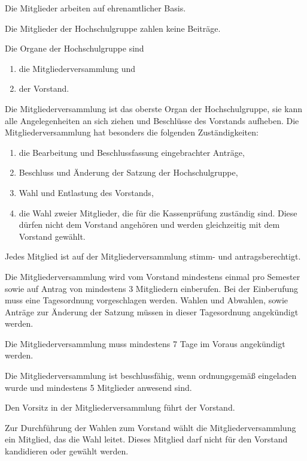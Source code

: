 \documentclass[a4paper, parskip=half, numbers=noenddot]{scrartcl}
\begin{document}
\begin{contract}
Die Mitglieder arbeiten auf ehrenamtlicher Basis.

Die Mitglieder der Hochschulgruppe zahlen keine Beiträge.

%
%


Die Organe der Hochschulgruppe sind

  \begin{enumerate}
  \item die Mitgliederversammlung und
  \item der Vorstand.
  \end{enumerate}


%
%

%

Die Mitgliederversammlung ist das oberste Organ der Hochschulgruppe,
sie kann alle Angelegenheiten an sich ziehen und Beschlüsse des Vorstands
aufheben. Die Mitgliederversammlung hat besonders die folgenden Zuständigkeiten:
\begin{enumerate}
  \item die Bearbeitung und Beschlussfassung eingebrachter Anträge,
  \item Beschluss und Änderung der Satzung der Hochschulgruppe,
  \item Wahl und Entlastung des Vorstands,
  \item die Wahl zweier Mitglieder, die für die Kassenprüfung zuständig sind.
    Diese dürfen nicht dem Vorstand angehören und werden gleichzeitig mit dem Vorstand gewählt.
\end{enumerate}

Jedes Mitglied ist auf der Mitgliederversammlung stimm- und antragsberechtigt.

Die Mitgliederversammlung wird vom Vorstand mindestens einmal pro Semester sowie
auf Antrag von mindestens 3 Mitgliedern einberufen.
Bei der Einberufung muss eine Tagesordnung vorgeschlagen werden.
Wahlen und Abwahlen, sowie Anträge zur Änderung der Satzung müssen in dieser
Tagesordnung angekündigt werden.

Die Mitgliederversammlung muss mindestens 7 Tage im Voraus angekündigt
werden.

Die Mitgliederversammlung ist beschlussfähig, wenn ordnungsgemäß eingeladen
wurde und mindestens 5 Mitglieder anwesend sind.

Den Vorsitz in der Mitgliederversammlung führt der Vorstand.

Zur Durchführung der Wahlen zum Vorstand wählt die Mitgliederversammlung ein
Mitglied, das die Wahl leitet.
Dieses Mitglied darf nicht für den Vorstand kandidieren oder gewählt werden.


\end{contract}
\end{document}
